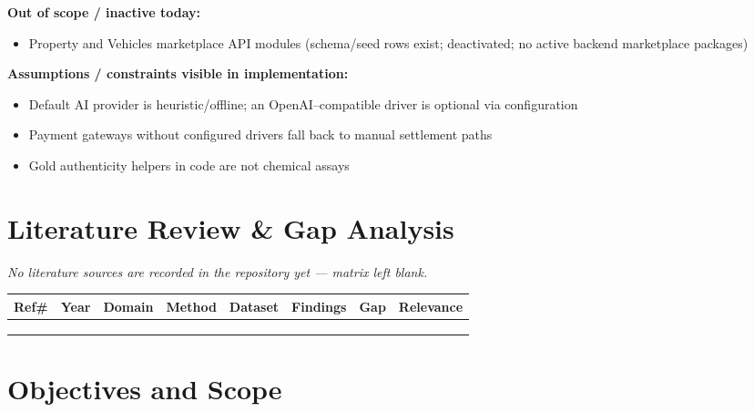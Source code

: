 \documentclass[11pt,a4paper]{article}
\begin{document}
\textbf{Out of scope / inactive today:}
\begin{itemize}[leftmargin=1.4em]
  \item Property and Vehicles marketplace API modules (schema/seed rows exist;
        deactivated; no active backend marketplace packages)
\end{itemize}

\textbf{Assumptions / constraints visible in implementation:}
\begin{itemize}[leftmargin=1.4em]
  \item Default AI provider is heuristic/offline; an OpenAI--compatible driver
        is optional via configuration
  \item Payment gateways without configured drivers fall back to manual
        settlement paths
  \item Gold authenticity helpers in code are not chemical assays
\end{itemize}

\section{Literature Review \& Gap Analysis}

\textit{No literature sources are recorded in the repository yet --- matrix left blank.}

\begin{tabularx}{\textwidth}{@{}
  >{\raggedright\arraybackslash}p{0.8cm}
  >{\raggedright\arraybackslash}p{1.0cm}
  >{\raggedright\arraybackslash}p{1.5cm}
  >{\raggedright\arraybackslash}p{1.6cm}
  >{\raggedright\arraybackslash}p{1.6cm}
  >{\raggedright\arraybackslash}p{1.8cm}
  >{\raggedright\arraybackslash}p{1.8cm}
  X@{}}
\toprule
\textbf{Ref\#} & \textbf{Year} & \textbf{Domain} & \textbf{Method} & \textbf{Dataset} & \textbf{Findings} & \textbf{Gap} & \textbf{Relevance} \\
\midrule
 &  &  &  &  &  &  &  \\
 &  &  &  &  &  &  &  \\
 &  &  &  &  &  &  &  \\
\bottomrule
\end{tabularx}

\section{Objectives and Scope}
\end{document}
